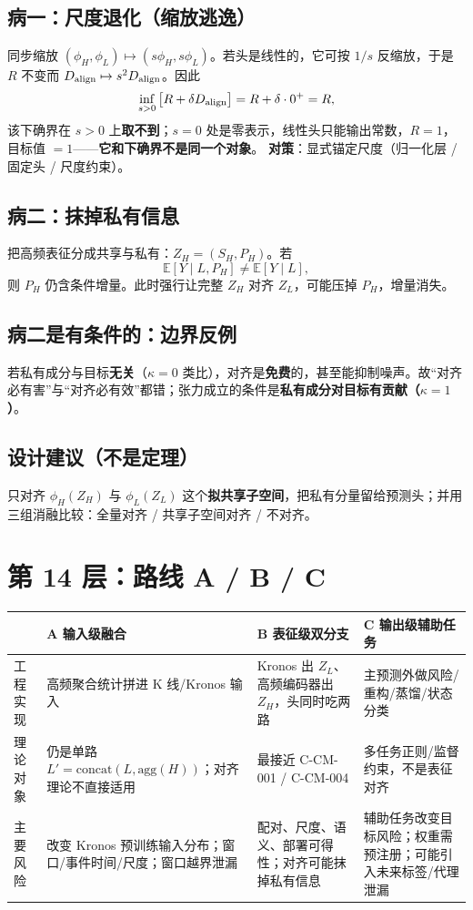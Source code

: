 \documentclass[UTF8,11pt,a4paper]{ctexart}
\newcommand{\E}{\mathbb{E}}
\begin{document}
\subsection{病一：尺度退化（缩放逃逸）}
同步缩放 $(\phi_H,\phi_L)\mapsto(s\phi_H,s\phi_L)$。若头是线性的，它可按 $1/s$ 反缩放，于是 $R$ 不变而 $D_{\rm align}\mapsto s^2D_{\rm align}$。因此
\[
\inf_{s>0}\big[R+\delta D_{\rm align}\big]=R+\delta\cdot0^{+}=R,
\]
该下确界在 $s>0$ 上\textbf{取不到}；$s=0$ 处是零表示，线性头只能输出常数，$R=1$，目标值 $=1$——\textbf{它和下确界不是同一个对象}。
\textbf{对策}：显式锚定尺度（归一化层 / 固定头 / 尺度约束）。

\subsection{病二：抹掉私有信息}
把高频表征分成共享与私有：$Z_H=(S_H,P_H)$。若
\begin{equation}
\E[Y\mid L,P_H]\ne\E[Y\mid L], \label{eq:priv}
\end{equation}
则 $P_H$ 仍含条件增量。此时强行让完整 $Z_H$ 对齐 $Z_L$，可能压掉 $P_H$，增量消失。

\subsection{病二是有条件的：边界反例}
若私有成分与目标\textbf{无关}（$\kappa=0$ 类比），对齐是\textbf{免费}的，甚至能抑制噪声。故``对齐必有害''与``对齐必有效''都错；张力成立的条件是\textbf{私有成分对目标有贡献（$\kappa=1$）}。

\subsection{设计建议（不是定理）}
只对齐 $\phi_H(Z_H)$ 与 $\phi_L(Z_L)$ 这个\textbf{拟共享子空间}，把私有分量留给预测头；并用三组消融比较：全量对齐 / 共享子空间对齐 / 不对齐。

\section{第 14 层：路线 A / B / C}

\begin{longtable}{p{}p{}p{}p{}}
\toprule
& \textbf{A 输入级融合} & \textbf{B 表征级双分支} & \textbf{C 输出级辅助任务}\\
\midrule
工程实现 & 高频聚合统计拼进 K 线/Kronos 输入 & Kronos 出 $Z_L$、高频编码器出 $Z_H$，头同时吃两路 & 主预测外做风险/重构/蒸馏/状态分类\\
理论对象 & 仍是单路 $L'=\text{concat}(L,\text{agg}(H))$；对齐理论不直接适用 & 最接近 C-CM-001 / C-CM-004 & 多任务正则/监督约束，不是表征对齐\\
主要风险 & 改变 Kronos 预训练输入分布；窗口/事件时间/尺度；窗口越界泄漏 & 配对、尺度、语义、部署可得性；对齐可能抹掉私有信息 & 辅助任务改变目标风险；权重需预注册；可能引入未来标签/代理泄漏\\
\bottomrule
\end{longtable}
\end{document}
